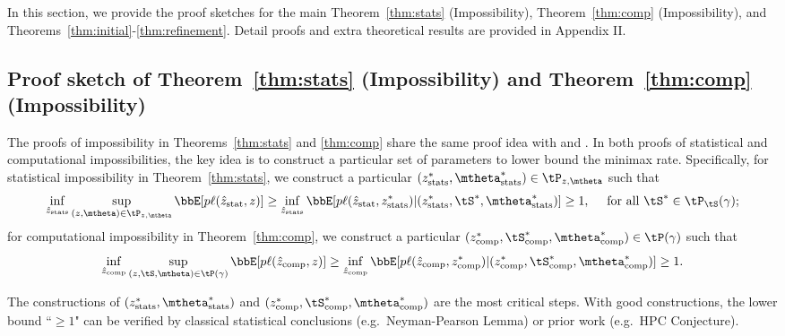 \documentclass[lettersize,onecolumn,journal]{IEEEtran}
\theoremstyle{definition}
\theoremstyle{definition}
\begin{document}
{
\color{blue}

In this section, we provide the proof sketches for the main Theorem~\ref{thm:stats} (Impossibility), Theorem~\ref{thm:comp} (Impossibility), and Theorems~\ref{thm:initial}-\ref{thm:refinement}. Detail proofs and extra theoretical results are provided in Appendix II.

\subsection{Proof sketch of Theorem~\ref{thm:stats} (Impossibility) and Theorem~\ref{thm:comp} (Impossibility)} \label{subsec:impossible}

The proofs of impossibility in Theorems~\ref{thm:stats} and \ref{thm:comp} share the same proof idea with \citet[Theorems 6 and 7]{han2020exact} and \citet[Theorem 2]{gao2018community}. In both proofs of statistical and computational impossibilities, the key idea is to construct a particular set of parameters to lower bound the minimax rate. Specifically, for statistical impossibility in Theorem~\ref{thm:stats}, we construct a particular $(z^*_{\rm stats}, \mtheta^*_{\rm stats})  \in \tP_{z, \mtheta} $ such that 
\begin{equation}\label{eq:stats_impo_sketch}
    \inf_{\hat z_{\rm stats}} \sup_{(z, \mtheta) \in \tP_{z, \mtheta}} \bbE[p \ell(\hat z_{\rm stat}, z)] \geq \inf_{\hat z_{\rm stats}} \bbE[p \ell(\hat z_{\rm stat}, z_{\rm stats}^*)| (z^*_{\rm stats}, \tS^*,\mtheta^*_{\rm stats})] \geq 1, \quad \text{ for all $\tS^* \in \tP_{\tS}(\gamma)$};  
\end{equation}
for computational impossibility in Theorem~\ref{thm:comp}, we construct a particular $(z^*_{\rm comp}, \tS^*_{\rm comp}, \mtheta^*_{\rm comp}) \in \tP(\gamma)$ such that 
\begin{equation}
    \inf_{\hat z_{\rm comp}} \sup_{(z, \tS, \mtheta) \in \tP(\gamma)} \bbE[p \ell(\hat z_{\rm comp}, z)] \geq \inf_{\hat z_{\rm comp}} \bbE[p \ell(\hat z_{\rm comp}, z_{\rm comp}^*)| (z^*_{\rm comp}, \tS^*_{\rm comp},\mtheta^*_{\rm comp})] \geq 1.
\end{equation}

The constructions of $(z^*_{\rm stats}, \mtheta^*_{\rm stats})$ and $(z^*_{\rm comp}, \tS^*_{\rm comp}, \mtheta^*_{\rm comp})$ are the most critical steps. With good constructions, the lower bound ``$\geq 1$" can be verified by classical statistical conclusions (e.g.\ Neyman-Pearson Lemma) or prior work (e.g.\ HPC Conjecture). 

}
\end{document}
